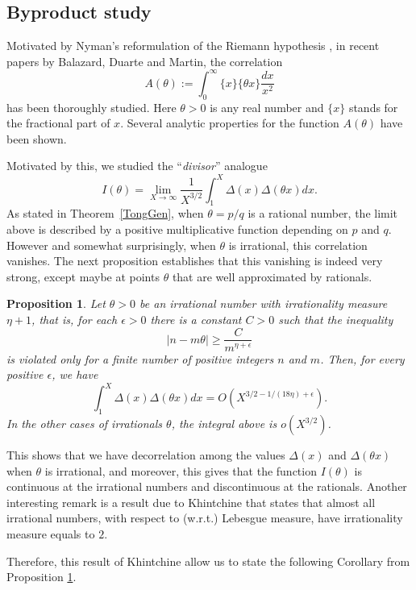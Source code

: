 \documentclass[a4paper,12pt, reqn0]{amsart}
\newtheorem{proposition}{Proposition}[section]
\theoremstyle{remark}
\begin{document}
\subsection{Byproduct study} Motivated by Nyman's reformulation of the
Riemann hypothesis \cite{nyman_RH}, in recent papers
\cite{duarte_balazard,balazard_martin_hal,balazard_martin} by
Balazard, Duarte and Martin, the correlation
\begin{equation*}
  A(\theta):=\int_0^\infty\{x\}\{\theta x\}\frac{dx}{x^2}
\end{equation*}
has been thoroughly studied. Here
$\theta>0$ is any real number and $\{x\}$ stands for the
fractional part of $x$. Several analytic properties for the function
$A(\theta)$ have been shown.

Motivated by this, we studied the ``\textit{divisor}'' analogue 
$$I(\theta)=\lim_{X\to\infty}\frac{1}{X^{3/2}}\int_{1}^X \Delta(x)\Delta(\theta x)dx.$$
As stated in Theorem~\ref{TongGen}, when $\theta=p/q$ is a rational
number, the limit above is described by a positive multiplicative
function depending on $p$ and $q$. However and somewhat surprisingly, when
$\theta$ is irrational, this correlation vanishes. The next proposition
establishes that this vanishing is indeed very strong, except maybe at
points $\theta$ that are well approximated by rationals.

\begin{proposition}\label{proposition decorrelation} Let $\theta>0$ be
  an irrational number with irrationality measure $\eta+1$, that is,
  for each $\epsilon>0$ there is a constant $C>0$ such that the
  inequality
$$|n-m\theta|\geq \frac{C}{m^{\eta+\epsilon}}$$
is violated only for a finite number of positive integers $n$ and
$m$. Then, for every positive $\epsilon$, we have
$$\int_{1}^X\Delta(x)\Delta(\theta x)dx=O(X^{3/2-1/(18\eta)+\epsilon}).$$
In the other cases of irrationals $\theta$, the integral above is $o(X^{3/2})$.
\end{proposition}
This shows that we have decorrelation among the values $\Delta(x)$ and
$\Delta(\theta x)$ when $\theta$ is irrational, and moreover, this
gives that the function $I(\theta)$ is continuous at the irrational numbers and discontinuous at the rationals. Another interesting remark is a result due to Khintchine \cite{khinchin_1924} that states that almost all irrational numbers, with respect to (w.r.t.) Lebesgue measure, have irrationality measure equals to $2$.

Therefore, this result of Khintchine allow us to state the following Corollary from Proposition \ref{proposition decorrelation}.
\end{document}
